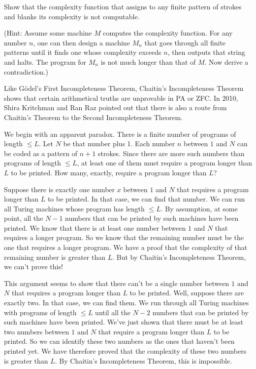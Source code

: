\begin{exercise}
  Show that the $\mathrm{complexity}$ function
  that assigns to any finite pattern of strokes and blanks its complexity
  is not computable.
  
  (Hint: Assume some machine $M$ computes the complexity function.
  For any number $n$,
  one can then design a machine $M_n$ that
  goes through all finite patterns
  until it finds one whose complexity exceeds $n$,
  then outputs that string and halts.
  The program for $M_n$ is not much longer than that of $M$.
  Now derive a contradiction.)
\end{exercise}

Like Gödel's First Incompleteness Theorem,
Chaitin's Incompleteness Theorem shows that
certain arithmetical truths are unprovable in PA or ZFC.
In 2010, Shira Kritchman and Ran Raz pointed out that
there is also a route from Chaitin's Theorem
to the Second Incompleteness Theorem.

We begin with an apparent paradox.
There is a finite number of programs of length $\leq L$.
Let $N$ be that number plus 1.
Each number $n$ between $1$ and $N$ can be coded as a pattern of $n+1$ strokes.
Since there are more such numbers than programs of length $\leq L$,
at least one of them must require a program longer than $L$ to be printed.
How many, exactly, require a program longer than $L$?

Suppose there is exactly one number $x$ between $1$ and $N$
that requires a program longer than $L$ to be printed.
In that case, we can find that number.
We can run all Turing machines whose program has length $\leq L$.
By assumption,
at some point,
all the $N\!-\!1$ numbers that can be printed by such machines have been printed.
We know that there is at least one number between $1$ and $N$
that requires a longer program.
So we know that the remaining number must be the one that requires a longer program.
We have a proof that the complexity of that remaining number is greater than $L$.
But by Chaitin's Incompleteness Theorem,
we can't prove this!

This argument seems to show that
there can't be a single number between $1$ and $N$
that requires a program longer than $L$ to be printed.
Well,
suppose there are exactly two.
In that case,
we can find them.
We run through all Turing machines with programs of length $\leq L$
until all the $N-2$ numbers that can be printed by such machines have been printed.
We've just shown that there must be at least two numbers between $1$ and $N$
that require a program longer than $L$ to be printed.
So we can identify these two numbers as the ones that haven't been printed yet.
We have therefore proved that the complexity of these two numbers is greater than $L$.
By Chaitin's Incompleteness Theorem,
this is impossible.

